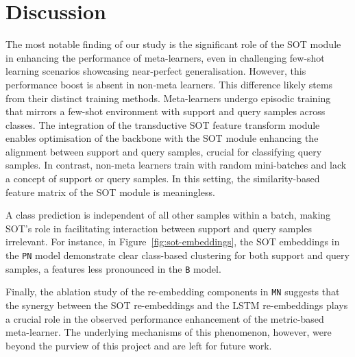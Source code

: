 \section{Discussion}

The most notable finding of our study is the significant role of the SOT module in enhancing the performance of meta-learners, even in challenging few-shot learning scenarios showcasing near-perfect generalisation. However, this performance boost is absent in non-meta learners. This difference likely stems from their distinct training methods. Meta-learners undergo episodic training that mirrors a few-shot environment with support and query samples across classes. The integration of the transductive SOT feature transform module enables optimisation of the backbone with the SOT module enhancing the alignment between support and query samples, crucial for classifying query samples. In contrast, non-meta learners train with random mini-batches and lack a concept of support or query samples. In this setting, the similarity-based feature matrix of the SOT module is meaningless.





A class prediction is independent of all other samples within a batch, making SOT's role in facilitating interaction between support and query samples irrelevant. For instance, in Figure~\ref{fig:sot-embeddings}, the SOT embeddings in the \texttt{PN} model demonstrate clear class-based clustering for both support and query samples, a features less pronounced in the \texttt{B} model.


Finally, the ablation study of the re-embedding components in \texttt{MN} suggests that the synergy between the SOT re-embeddings and the LSTM re-embeddings plays a crucial role in the observed performance enhancement of the metric-based meta-learner. The underlying mechanisms of this phenomenon, however, were beyond the purview of this project and are left for future work.
